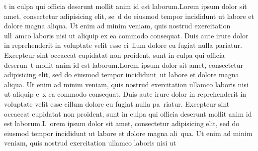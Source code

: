 \documentclass{paper}
\begin{document}
t in culpa qui officia deserunt mollit anim id est laborum.Lorem ipsum dolor sit amet, consectetur adipisicing elit, se\
d do eiusmod tempor incididunt ut labore et dolore magna aliqua. Ut enim ad minim veniam, quis nostrud exercitation ull\
amco laboris nisi ut aliquip ex ea commodo consequat. Duis aute irure dolor in reprehenderit in voluptate velit esse ci\
llum dolore eu fugiat nulla pariatur. Excepteur sint occaecat cupidatat non proident, sunt in culpa qui officia deserun\
t mollit anim id est laborum.Lorem ipsum dolor sit amet, consectetur adipisicing elit, sed do eiusmod tempor incididunt\
 ut labore et dolore magna aliqua. Ut enim ad minim veniam, quis nostrud exercitation ullamco laboris nisi ut aliquip e\
x ea commodo consequat. Duis aute irure dolor in reprehenderit in voluptate velit esse cillum dolore eu fugiat nulla pa\
riatur. Excepteur sint occaecat cupidatat non proident, sunt in culpa qui officia deserunt mollit anim id est laborum.L\
orem ipsum dolor sit amet, consectetur adipisicing elit, sed do eiusmod tempor incididunt ut labore et dolore magna ali\
qua. Ut enim ad minim veniam, quis nostrud exercitation ullamco laboris nisi ut
\end{document}
